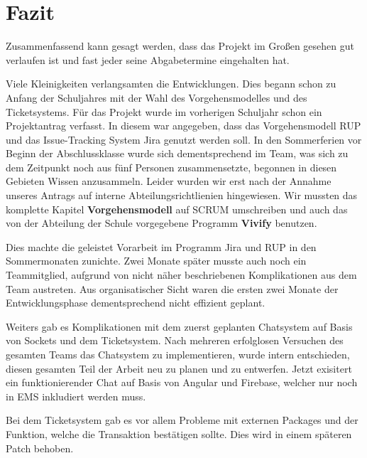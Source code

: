 \chapter{Fazit}

Zusammenfassend kann gesagt werden, dass das Projekt im Großen gesehen gut verlaufen ist und fast jeder seine Abgabetermine eingehalten hat.

Viele Kleinigkeiten verlangsamten die Entwicklungen. Dies begann schon zu Anfang der Schuljahres mit der Wahl des Vorgehensmodelles und des Ticketsystems.
Für das Projekt wurde im vorherigen Schuljahr schon ein Projektantrag verfasst. In diesem war angegeben, dass das Vorgehensmodell RUP und das Issue-Tracking
System Jira genutzt werden soll. In den Sommerferien vor Beginn der Abschlussklasse wurde sich dementsprechend im Team, was sich zu dem Zeitpunkt noch
aus fünf Personen zusammensetzte, begonnen in diesen Gebieten Wissen anzusammeln. Leider wurden wir erst nach der Annahme unseres Antrags auf interne Abteilungsrichtlienien
hingewiesen. Wir mussten das komplette Kapitel \textbf{Vorgehensmodell} auf SCRUM umschreiben und auch das von der Abteilung der Schule vorgegebene Programm \textbf{Vivify} benutzen.

Dies machte die geleistet Vorarbeit im Programm Jira und RUP in den Sommermonaten zunichte. Zwei Monate später musste auch noch ein Teammitglied, aufgrund von nicht näher beschriebenen
Komplikationen aus dem Team austreten. Aus organisatischer Sicht waren die ersten zwei Monate der Entwicklungsphase dementsprechend nicht effizient geplant.

Weiters gab es Komplikationen mit dem zuerst geplanten Chatsystem auf Basis von Sockets und dem Ticketsystem.
Nach mehreren erfolglosen Versuchen des gesamten Teams das Chatsystem zu implementieren, wurde intern entschieden, diesen gesamten Teil der Arbeit neu zu planen und zu entwerfen.
Jetzt exisitert ein funktionierender Chat auf Basis von Angular und Firebase, welcher nur noch
in EMS inkludiert werden muss.

Bei dem Ticketsystem gab es vor allem Probleme mit externen Packages und der Funktion, welche die Transaktion bestätigen sollte. Dies wird in einem späteren Patch behoben. 

